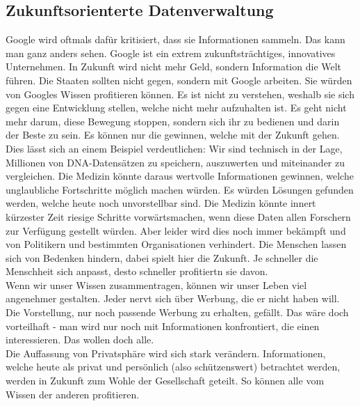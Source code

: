 \subsection{Zukunftsorienterte Datenverwaltung}
Google wird oftmals dafür kritisiert, dass sie Informationen sammeln. 
Das kann man ganz anders sehen. Google ist ein extrem zukunftsträchtiges, 
innovatives Unternehmen. In Zukunft wird nicht mehr Geld, sondern 
Information die Welt führen. Die Staaten sollten nicht gegen, sondern 
mit Google arbeiten. Sie würden von Googles Wissen profitieren können.
Es ist nicht zu verstehen, weshalb sie sich gegen eine Entwicklung stellen, welche 
nicht mehr aufzuhalten ist. Es geht nicht mehr darum, diese Bewegung 
stoppen, sondern sich ihr zu bedienen und darin der Beste zu sein. Es 
können nur die gewinnen, welche mit der Zukunft gehen.\\
Dies l\"asst sich an einem Beispiel verdeutlichen: Wir sind technisch in 
der Lage, Millionen von DNA-Datensätzen zu speichern, auszuwerten und 
miteinander zu vergleichen. Die Medizin könnte daraus wertvolle 
Informationen gewinnen, welche unglaubliche Fortschritte möglich machen 
würden. Es würden Lösungen gefunden werden, welche heute noch unvorstellbar 
sind. Die Medizin könnte innert kürzester Zeit riesige Schritte 
vorwärtsmachen, wenn diese Daten allen Forschern zur Verfügung gestellt 
würden. Aber leider wird dies noch immer bekämpft und von Politikern 
und bestimmten Organisationen verhindert. Die Menschen lassen sich von Bedenken 
hindern, dabei spielt hier die Zukunft. Je schneller die Menschheit sich anpasst, 
desto schneller profitiertn sie davon.\\
Wenn wir unser Wissen zusammentragen, können wir unser Leben viel 
angenehmer gestalten. Jeder nervt sich über Werbung, die er nicht haben 
will. Die Vorstellung, nur noch passende 
Werbung zu erhalten, gef\"allt. Das wäre doch vorteilhaft - man wird nur noch mit 
Informationen konfrontiert, die einen interessieren. Das wollen doch 
alle.\\
Die Auffassung von Privatsphäre wird sich stark 
verändern. Informationen, welche heute als privat und persönlich 
(also schützenswert) betrachtet werden, werden in Zukunft zum Wohle der 
Gesellschaft geteilt. So können alle vom Wissen der anderen profitieren.

